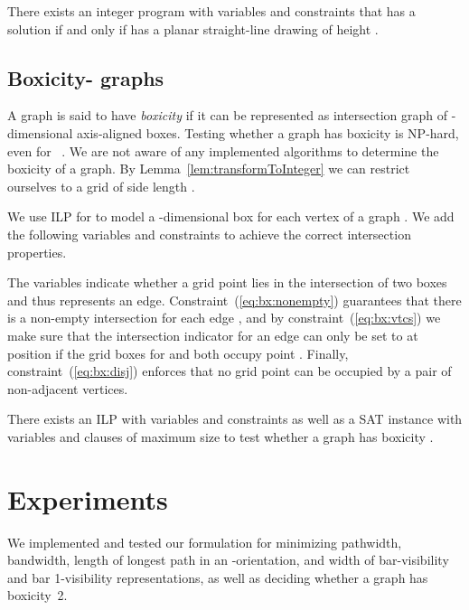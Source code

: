 \documentclass[runningheads]{llncs}
\newcounter{constr}
\begin{document}
\begin{corollary}
There exists an integer program with  variables and
constraints that has a solution if and only if   has
a planar straight-line drawing of height .
\end{corollary}

\fi


\subsection{Boxicity- graphs}\label{sec:boxicity}
A graph is said to have {\em boxicity}  if it can be represented
as intersection graph of -dimensional axis-aligned boxes. Testing
whether a graph has boxicity  is NP-hard, even for
~\cite{Kra94}. We are not aware of any implemented algorithms to
determine the boxicity of a graph. By
Lemma~\ref{lem:transformToInteger} we can restrict ourselves to a grid
of side length .

We use ILP  for  to model a
-dimensional box for each vertex of a graph . We add the
following variables and constraints to achieve the correct
intersection properties.

The variables  indicate whether a grid point lies in
the intersection of two boxes and thus represents an edge.
Constraint~(\ref{eq:bx:nonempty}) guarantees that there is a non-empty
intersection for each edge , and by
constraint~(\ref{eq:bx:vtcs}) we make sure that the intersection
indicator for an edge  can only be set to  at position
 if the grid boxes for  and  both occupy point
. Finally, constraint~(\ref{eq:bx:disj}) enforces that no
grid point can be occupied by a pair of non-adjacent vertices.



\begin{theorem}
There exists an ILP with  variables and
 constraints 
as well as a SAT instance with  variables and
 clauses of maximum size 
to test whether a graph  has boxicity .
\end{theorem}


\section{Experiments}\label{sec:exp}
We implemented and tested our formulation for minimizing pathwidth, bandwidth,
length of longest path in an -orientation, and width of
bar-visibility and bar 1-visibility representations, as well as
deciding whether a graph has boxicity~2.
\par
\end{document}
